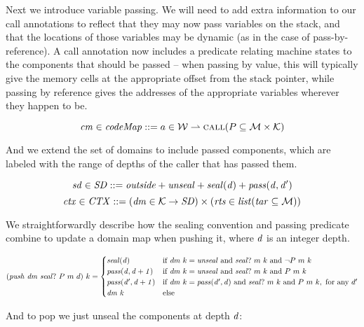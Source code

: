 \documentclass[acmsmall,review,anonymous]{acmart}\settopmatter{printfolios=true,printccs=false,printacmref=false}
\begin{document}
Next we introduce variable passing. We will need to add extra information to our call
annotations to reflect that they may now pass variables on the stack, and that the locations
of those variables may be dynamic (as in the case of pass-by-reference).
A call annotation now includes a predicate relating machine states to the components
that should be passed -- when passing by value, this will typically give the memory cells
at the appropriate offset from the stack pointer, while passing by reference gives the
addresses of the appropriate variables wherever they happen to be.

\[\mathit{cm} \in \mathit{codeMap} ::= a \in {\mathcal W} \rightharpoonup \text{\sc call}(P \subseteq {\mathcal M} \times {\mathcal K})\]

And we extend the set of domains to include passed components,
which are labeled with the range of depths of the caller that has passed them.

\[\mathit{sd} \in \mathit{SD} ::= \mathit{outside} + \mathit{unseal} + \mathit{seal(d)} + \mathit{pass(d,d')}\]
\[\mathit{ctx} \in \mathit{CTX} ::= (\mathit{dm} \in {\mathcal K} \rightarrow \mathit{SD})
\times (\mathit{rts} \in \mathit{list} (\mathit{tar} \subseteq {\mathcal M})) \]

We straightforwardly describe how the sealing convention and passing predicate combine to
update a domain map when pushing it, where \(d\) is an integer depth.

\[(\mathit{push} ~ \mathit{dm} ~ \mathit{seal?} ~ P ~ m ~ d) ~ k =
\begin{cases}
  \mathit{seal(d)}              & \text{if } \mathit{dm} ~ k = \mathit{unseal} \text{ and }
                                 \mathit{seal?} ~ m ~ k \text{ and } \neg P ~ m ~ k \\
  \mathit{pass(d,d+1)}     & \text{if } \mathit{dm} ~ k = \mathit{unseal} \text{ and }
                                 \mathit{seal?} ~ m ~ k \text{ and } P ~ m ~ k \\
  \mathit{pass(d',d+1)}    & \text{if } \mathit{dm} ~ k = \mathit{pass(d',d)} \text{ and }
                                 \mathit{seal?} ~ m ~ k \text{ and } P ~ m ~ k,
                                 \text{ for any } d' \\
  \mathit{dm}~k & \text{else} \\
\end{cases}\]

And to pop we just unseal the components at depth \(d\):
\end{document}
